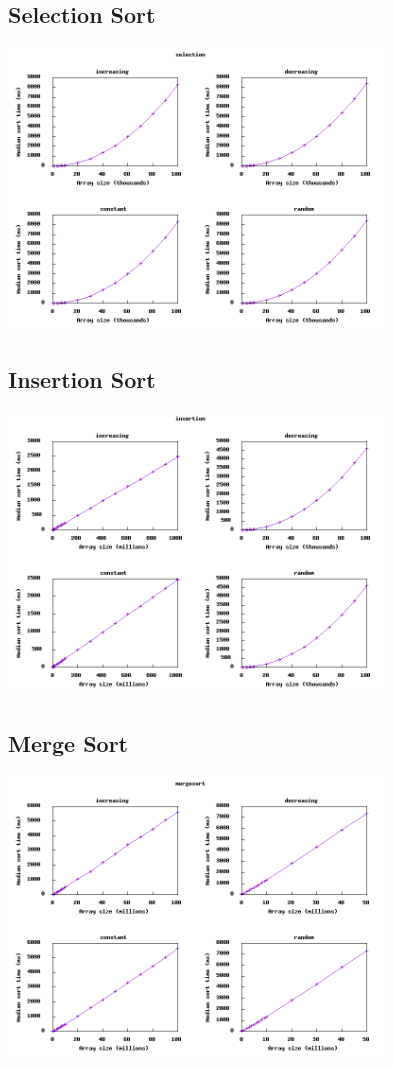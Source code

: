 \documentclass[11pt]{article}
\begin{document}
\subsection{Selection Sort}
\label{sec:org20e9e2f}
\begin{center}
\includegraphics[width=10cm]{./output/selection.png}
\end{center}

\subsection{Insertion Sort}
\label{sec:orgc699f08}
\begin{center}
\includegraphics[width=10cm]{./output/insertion.png}
\end{center}

\subsection{Merge Sort}
\label{sec:org92d86f9}
\begin{center}
\includegraphics[width=10cm]{./output/mergesort.png}
\end{center}
\end{document}
